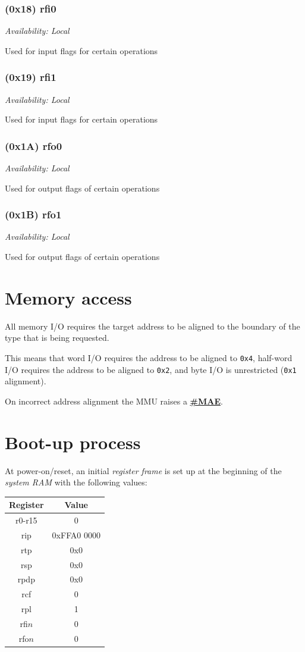 \documentclass[a4paper,10pt]{article}
\begin{document}
\subsubsection{(0x18) rfi0}
{\small \textit{Availability: Local}}

Used for input flags for certain operations

\subsubsection{(0x19) rfi1}
{\small \textit{Availability: Local}}

Used for input flags for certain operations

\subsubsection{(0x1A) rfo0}
{\small \textit{Availability: Local}}

Used for output flags of certain operations

\subsubsection{(0x1B) rfo1}
{\small \textit{Availability: Local}}

Used for output flags of certain operations

\section{Memory access} \label{ma}
All memory I/O requires the target address to be aligned to the boundary of the type that is being requested.

This means that word I/O requires the address to be aligned to \verb|0x4|, half-word I/O requires the address to be aligned to \verb|0x2|, and byte I/O is unrestricted (\verb|0x1| alignment).

On incorrect address alignment the MMU raises a \textbf{\hyperref[ir:MAE]{\#MAE}}.

\section{Boot-up process}
At power-on/reset, an initial \emph{register frame} is set up at the beginning of the \emph{system RAM} with the following values:

\begin{table}[H]
	\centering
	{
		\begin{tabular}{|c|c|}
\hline
Register & Value \\
\hline
r0-r15 & 0 \\
\hline
rip & 0xFFA0 0000 \\
\hline
rtp & 0x0 \\
\hline
rsp & 0x0 \\
\hline
rpdp & 0x0 \\
\hline
rcf & 0 \\
\hline
rpl & 1 \\
\hline
rfi$n$ & 0 \\
\hline
rfo$n$ & 0 \\
\hline
		\end{tabular}
	}
\end{table}
\end{document}

